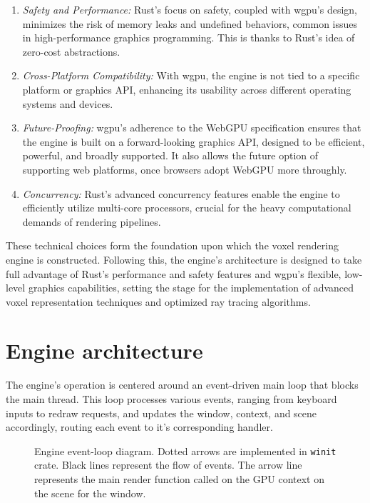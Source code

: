\begin{enumerate}
  \item \emph{Safety and Performance:} Rust’s focus on safety, coupled with wgpu's design, minimizes the risk of memory leaks and undefined behaviors, common issues in high-performance graphics programming. This is thanks to Rust's idea of zero-cost abstractions.

  \item \emph{Cross-Platform Compatibility:} With wgpu, the engine is not tied to a specific platform or graphics API, enhancing its usability across different operating systems and devices.

  \item \emph{Future-Proofing:} wgpu's adherence to the WebGPU specification ensures that the engine is built on a forward-looking graphics API, designed to be efficient, powerful, and broadly supported. It also allows the future option of supporting web platforms, once browsers adopt WebGPU more throughly.

  \item \emph{Concurrency:} Rust’s advanced concurrency features enable the engine to efficiently utilize multi-core processors, crucial for the heavy computational demands of rendering pipelines.
\end{enumerate}

These technical choices form the foundation upon which the voxel rendering engine is constructed. Following this, the engine's architecture is designed to take full advantage of Rust's performance and safety features and wgpu's flexible, low-level graphics capabilities, setting the stage for the implementation of advanced voxel representation techniques and optimized ray tracing algorithms.


\section{Engine architecture}

The engine's operation is centered around an event-driven main loop that blocks the main thread.
This loop processes various events, ranging from keyboard inputs to redraw requests, and updates the window, context, and scene accordingly, routing each event to it's corresponding handler.

\begin{figure}[H]
  \centering
  
  \caption{Engine event-loop diagram. Dotted arrows are implemented in \texttt{winit} crate. Black lines represent the flow of events. The arrow line represents the main render function called on the GPU context on the scene for the window.}
\end{figure}


